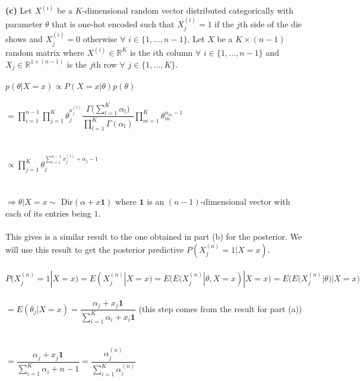 \documentclass[submit]{harvardml}
\newcommand{\R}{\mathbb{R}}
\begin{document}
\textbf{(c)} Let $X^{(i)}$ be a $K$-dimensional random vector distributed categorically with parameter $\theta$ that is one-hot encoded such that $X_j^{(i)}=1$ if the $j$th side of the die shows and $X_j^{(i)}=0$ otherwise $\forall$ $i\in\{1,...,n-1\}$. Let $X$ be a $K\times(n-1)$ random matrix where $X^{(i)}\in\R^{K}$ is the $i$th column $\forall$ $i\in\{1,...,n-1\}$ and $X_j\in\R^{1\times(n-1)}$ is the $j$th row $\forall$ $j\in\{1,...,K\}$.\\\\
$p(\theta|X=x)\propto P(X=x|\theta)p(\theta)$\\\\
$=\displaystyle\prod_{i=1}^{n-1}\displaystyle\prod_{j=1}^{K}\theta_j^{x_j^{(i)}}\dfrac{\Gamma\Big(\sum_{l=1}^{K}\alpha_l\Big)}{\prod_{l=1}^{K}\Gamma(\alpha_l)}\displaystyle\prod_{m=1}^{K}\theta_m^{\alpha_m-1}$\\\\\\
$\propto\displaystyle\prod_{j=1}^{K}\theta_j^{\sum_{i=1}^{n-1}x_j^{(i)}+\alpha_j-1}$\\\\\\
$\Rightarrow \theta|X=x\sim$ Dir$(\alpha+x\mathbf{1})$ where $\mathbf{1}$ is an $(n-1)$-dimensional vector with each of its entries being $1$.\\\\
This gives is a similar result to the one obtained in part (b) for the posterior. We will use this result to get the posterior predictive $P(X_j^{(n)}=1|X=x)$.\\\\
$P(X_j^{(n)}=1|X=x)=E(X_j^{(n)}|X=x)=E\big(E(X_j^{(n)}|\theta,X=x)|X=x\big)=E\big(E(X_j^{(n)}|\theta)|X=x\big)$\\\\
$=E(\theta_j|X=x)=\dfrac{\alpha_j+x_j\mathbf{1}}{\sum_{i=1}^{K}\alpha_i+x_i\mathbf{1}}$ (this step comes from the result for part (a))\\\\\\
$=\dfrac{\alpha_j+x_j\mathbf{1}}{\sum_{i=1}^{K}\alpha_i+n-1}=\dfrac{\alpha^{(n)}_{j}}{\sum_{i=1}^{K} \alpha^{(n)}_{i}}$\\\\\\
\end{document}
